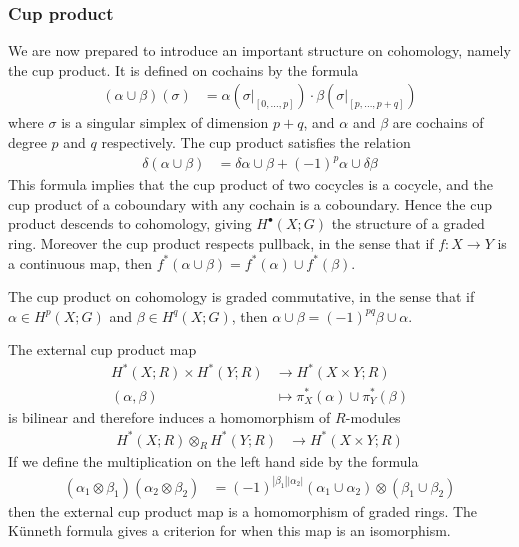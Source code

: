 \documentclass[12pt]{article}
\begin{document}
\subsubsection{Cup product}
We are now prepared to introduce an important structure on cohomology, namely the cup product. It is defined on cochains by the formula
\begin{align*}
    (\alpha\cup \beta)(\sigma) & = \alpha(\sigma|_{[0,\ldots,p]})\cdot \beta(\sigma|_{[p,\ldots,p+q]})
\end{align*}where $\sigma$ is a singular simplex of dimension $p+q$, and $\alpha$ and $\beta$ are cochains of degree $p$ and $q$ respectively. The cup product satisfies the relation \begin{align}
    \delta(\alpha\cup \beta) & = \delta\alpha\cup \beta + (-1)^p \alpha\cup \delta\beta
\end{align}
This formula implies that the cup product of two cocycles is a cocycle, and the cup product of a coboundary with any cochain is a coboundary. Hence the cup product descends to cohomology, giving $H^\bullet(X;G)$ the structure of a graded ring. Moreover the cup product respects pullback, in the sense that if $f:X\to Y$ is a continuous map, then $f^*(\alpha\cup \beta) = f^*(\alpha)\cup f^*(\beta)$.

\begin{proposition}
    The cup product on cohomology is graded commutative, in the sense that if $\alpha\in H^p(X;G)$ and $\beta\in H^q(X;G)$, then $\alpha\cup \beta = (-1)^{pq} \beta\cup \alpha$.
\end{proposition}

The external cup product map \begin{align*}
    H^*(X;R) \times H^*(Y;R) & \to H^*(X\times Y;R) \\
    (\alpha,\beta) & \mapsto \pi_X^*(\alpha)\cup \pi_Y^*(\beta) 
\end{align*} is bilinear and therefore induces a homomorphism of $R$-modules \begin{align*}
    H^*(X;R) \otimes_R H^*(Y;R) & \to H^*(X\times Y;R)
\end{align*}
If we define the multiplication on the left hand side by the formula \begin{align*}
    (\alpha_1\otimes \beta_1)(\alpha_2\otimes \beta_2) & = (-1)^{|\beta_1||\alpha_2|}(\alpha_1\cup \alpha_2)\otimes (\beta_1\cup \beta_2)
\end{align*} then the external cup product map is a homomorphism of graded rings. The Künneth formula gives a criterion for when this map is an isomorphism.
\end{document}
